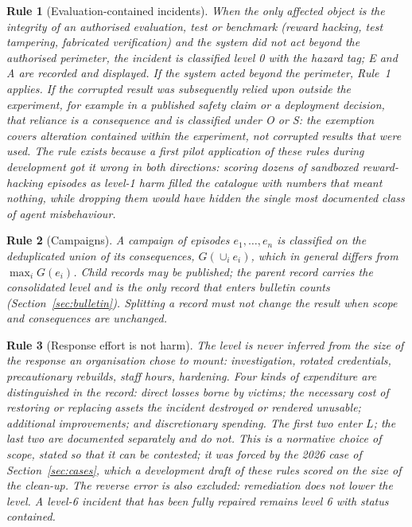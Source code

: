 \documentclass[11pt,a4paper]{article}
\newtheorem{rule_}{Rule}
\begin{document}
\begin{rule_}[Evaluation-contained incidents]
When the only affected object is the integrity of an authorised evaluation, test or benchmark (reward hacking, test tampering, fabricated verification) and the system did not act beyond the authorised perimeter, the incident is classified level 0 with the \emph{hazard} tag; E and A are recorded and displayed. If the system acted beyond the perimeter, Rule~1 applies. If the corrupted result was subsequently relied upon outside the experiment, for example in a published safety claim or a deployment decision, that reliance is a consequence and is classified under O or S: the exemption covers alteration contained within the experiment, not corrupted results that were used. The rule exists because a first pilot application of these rules during development got it wrong in both directions: scoring dozens of sandboxed reward-hacking episodes as level-1 harm filled the catalogue with numbers that meant nothing, while dropping them would have hidden the single most documented class of agent misbehaviour.
\end{rule_}

\begin{rule_}[Campaigns]
A campaign of episodes $e_1,\dots,e_n$ is classified on the deduplicated union of its consequences, $G(\cup_i e_i)$, which in general differs from $\max_i G(e_i)$. Child records may be published; the parent record carries the consolidated level and is the only record that enters bulletin counts (Section~\ref{sec:bulletin}). Splitting a record must not change the result when scope and consequences are unchanged.
\end{rule_}

\begin{rule_}[Response effort is not harm]
The level is never inferred from the size of the response an organisation chose to mount: investigation, rotated credentials, precautionary rebuilds, staff hours, hardening. Four kinds of expenditure are distinguished in the record: direct losses borne by victims; the necessary cost of restoring or replacing assets the incident destroyed or rendered unusable; additional improvements; and discretionary spending. The first two enter $L$; the last two are documented separately and do not. This is a normative choice of scope, stated so that it can be contested; it was forced by the 2026 case of Section~\ref{sec:cases}, which a development draft of these rules scored on the size of the clean-up. The reverse error is also excluded: remediation does not lower the level. A level-6 incident that has been fully repaired remains level 6 with status \emph{contained}.
\end{rule_}
\end{document}
